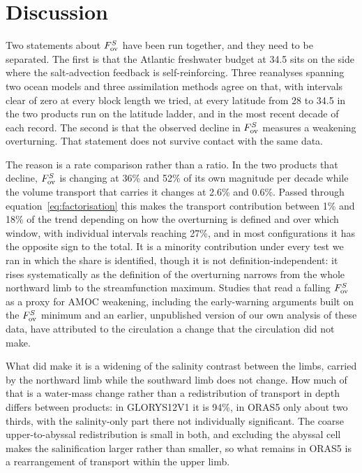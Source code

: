 \section*{Discussion}

Two statements about $F_{\mathrm{ov}}^{S}$ have been run together, and they need to be
separated. The first is that the Atlantic freshwater budget at 34.5\degS{} sits
on the side where the salt-advection feedback is self-reinforcing. Three
reanalyses spanning two ocean models and three assimilation methods agree on
that, with intervals clear of zero at every block length we tried, at every
latitude from 28 to 34.5\degS{} in the two products run on the latitude ladder, and in the most recent decade of each record.
The second is that the observed decline in $F_{\mathrm{ov}}^{S}$ measures a weakening
overturning. That statement does not survive contact with the same data.

The reason is a rate comparison rather than a ratio. In the two products that
decline, $F_{\mathrm{ov}}^{S}$ is changing at 36\% and 52\% of its own magnitude per decade
while the volume transport that carries it changes at 2.6\% and 0.6\%. Passed
through equation~\eqref{eq:factorisation} this makes the transport contribution
between 1\% and 18\% of the trend depending on how the overturning is defined
and over which window, with individual intervals reaching 27\%, and in most
configurations it has the opposite sign to the total. It is a minority
contribution under every test we ran in which the share is identified, though it
is not definition-independent:
it rises systematically as the definition of the overturning narrows from the
whole northward limb to the streamfunction maximum. Studies that read a falling
$F_{\mathrm{ov}}^{S}$ as a proxy for AMOC weakening, including the early-warning arguments
built on the $F_{\mathrm{ov}}^{S}$ minimum\cite{vanWesten2024} and an earlier, unpublished
version of our own analysis of these data, have attributed to the circulation a
change that the circulation did not make.

What did make it is a widening of the salinity contrast between the limbs,
carried by the northward limb while the southward limb does not change. How much
of that is a water-mass change rather than a redistribution of transport in
depth differs between products: in GLORYS12V1 it is 94\%, in ORAS5 only about
two thirds, with the salinity-only part there not individually significant. The
coarse upper-to-abyssal redistribution is small in both, and excluding the
abyssal cell makes the salinification larger rather than smaller, so what
remains in ORAS5 is a rearrangement of transport within the upper limb.

